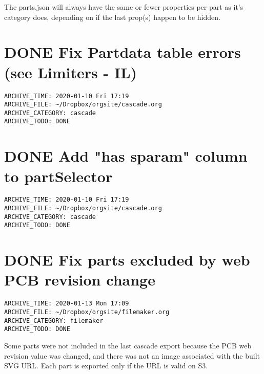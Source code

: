 \documentclass[11pt]{article}
\begin{document}
The parts.json will always have the same or fewer properties per part as it's category does, depending on if the last prop(s) happen to be hidden.\\

\section*{{\bfseries\sffamily DONE}  Fix Partdata table errors (see Limiters - IL)}
\label{sec:orgc677b7b}
\begin{verbatim}
ARCHIVE_TIME: 2020-01-10 Fri 17:19
ARCHIVE_FILE: ~/Dropbox/orgsite/cascade.org
ARCHIVE_CATEGORY: cascade
ARCHIVE_TODO: DONE
\end{verbatim}

\section*{{\bfseries\sffamily DONE}  Add "has sparam" column to partSelector}
\label{sec:org7dd44be}
\begin{verbatim}
ARCHIVE_TIME: 2020-01-10 Fri 17:19
ARCHIVE_FILE: ~/Dropbox/orgsite/cascade.org
ARCHIVE_CATEGORY: cascade
ARCHIVE_TODO: DONE
\end{verbatim}

\section*{{\bfseries\sffamily DONE}  Fix parts excluded by web PCB revision change}
\label{sec:org144f0a0}
\begin{verbatim}
ARCHIVE_TIME: 2020-01-13 Mon 17:09
ARCHIVE_FILE: ~/Dropbox/orgsite/filemaker.org
ARCHIVE_CATEGORY: filemaker
ARCHIVE_TODO: DONE
\end{verbatim}
Some parts were not included in the last cascade export because the PCB web revision value was changed, and there was not an image associated with the built SVG URL. Each part is exported only if the URL is valid on S3.\\
\end{document}

